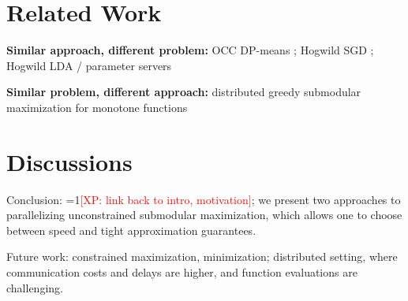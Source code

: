 \documentclass{article} %
\newcommand{\Comments}{1}
\newcommand{\note}[2]{\ifnum\Comments=1\textcolor{#1}{#2}\fi}
\newcommand{\xinghao}[1]{\note{red}{[XP: #1]}}
\begin{document}
\section{Related Work}
\textbf{Similar approach, different problem: } OCC DP-means \cite{pan2013}; Hogwild SGD \cite{Recht11}; Hogwild LDA \cite{Ahmed12} / parameter servers \cite{li2013, ho2013}

\textbf{Similar problem, different approach: } distributed greedy submodular maximization for monotone functions \cite{Mirzasoleiman2013}






\section{Discussions}

Conclusion: \xinghao{link back to intro, motivation}; we present two approaches to parallelizing unconstrained submodular maximization, which allows one to choose between speed and tight approximation guarantees.

Future work: constrained maximization, minimization; distributed setting, where communication costs and delays are higher, and function evaluations are challenging.


{\footnotesize




}

\newpage
\appendix



\newpage
\end{document}
